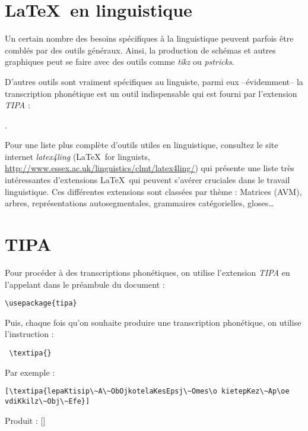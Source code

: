 


\section{\LaTeX\ en linguistique}

Un certain nombre des besoins spécifiques à la linguistique peuvent
parfois être comblés par des outils généraux. Ainsi, la production de
schémas et autres graphiques peut se faire avec des outils comme
\emph{tikz} ou \emph{pstricks}.

D'autres outils sont vraiment spécifiques au linguiste, parmi eux
--évidemment-- la transcription phonétique est un outil indispensable
qui est fourni par l'extension \emph{TIPA} :

.

Pour une liste plus complète d'outils utiles en linguistique,
consultez le site internet \emph{latex4ling} (\LaTeX\ for linguists,
\url{http://www.essex.ac.uk/linguistics/clmt/latex4ling/}) qui
présente une liste très intéressantes d'extensions \LaTeX\ qui peuvent
s'avérer cruciales dans le travail linguistique. Ces différentes
extensions sont classées par \og thème \fg : Matrices (AVM), arbres,
représentations autosegmentales, grammaires catégorielles,
gloses\ldots


\section{TIPA}

Pour procéder à des transcriptions phonétiques, on utilise l'extension
\emph{TIPA} en l'appelant dans le préambule du document :

\begin{verbatim}
\usepackage{tipa}
\end{verbatim}

Puis, chaque fois qu'on souhaite produire une transcription
phonétique, on utilise l'instruction :

\begin{verbatim}
 \textipa{}
\end{verbatim}

Par exemple :

\begin{verbatim}
[\textipa{lepaKtisip\~A\~ObOjkotelaKesEpsj\~Omes\o kietepKez\~Ap\oe vdiKkilz\~Obj\~Efe}]
\end{verbatim}

Produit : []

